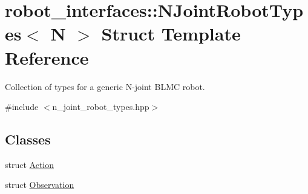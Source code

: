 \hypertarget{structrobot__interfaces_1_1NJointRobotTypes}{}\section{robot\+\_\+interfaces\+:\+:N\+Joint\+Robot\+Types$<$ N $>$ Struct Template Reference}
\label{structrobot__interfaces_1_1NJointRobotTypes}


Collection of types for a generic N-\/joint B\+L\+MC robot.  




{\ttfamily \#include $<$n\+\_\+joint\+\_\+robot\+\_\+types.\+hpp$>$}

\subsection*{Classes}
\begin{DoxyCompactItemize}
\item 
struct \hyperlink{structrobot__interfaces_1_1NJointRobotTypes_1_1Action}{Action}
\item 
struct \hyperlink{structrobot__interfaces_1_1NJointRobotTypes_1_1Observation}{Observation}
\end{DoxyCompactItemize}
